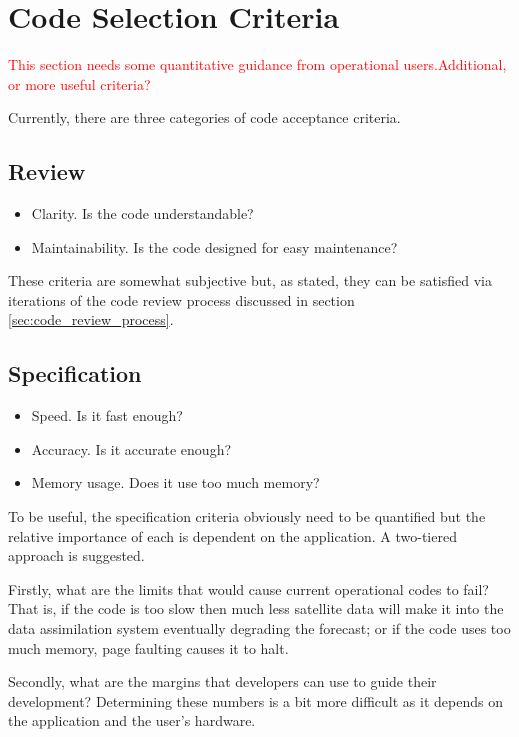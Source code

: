 \section{Code Selection Criteria}
\label{sec:code_selection_criteria}
\textcolor{red}{This section needs some quantitative guidance from operational users.Additional, or more useful criteria?}

Currently, there are three categories of code acceptance criteria.

\subsection{Review}
\begin{itemize}
  \item Clarity. Is the code understandable?
  \item Maintainability. Is the code designed for easy maintenance?
\end{itemize}
These criteria are somewhat subjective but, as stated, they can be satisfied via iterations of the code review process discussed in section \ref{sec:code_review_process}.

\subsection{Specification}
\begin{itemize}
  \item Speed. Is it fast enough?
  \item Accuracy. Is it accurate enough?
  \item Memory usage. Does it use too much memory?
\end{itemize}
To be useful, the specification criteria obviously need to be quantified but the relative importance of each is dependent on the application. A two-tiered approach is suggested.

Firstly, what are the limits that would cause current operational codes to fail? That is, if the code is too slow then much less satellite data will make it into the data assimilation system eventually degrading the forecast; or if the code uses too much memory, page faulting causes it to halt.

Secondly, what are the margins that developers can use to guide their development? Determining these numbers is a bit more difficult as it depends on the application and the user's hardware.

